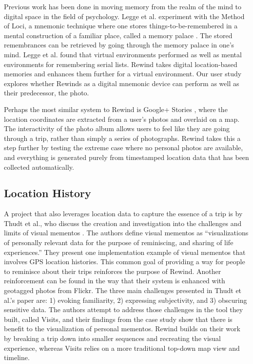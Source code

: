 \documentclass{sigchi}
\begin{document}
Previous work has been done in moving memory from the realm of the mind to digital space in the field of psychology. Legge et al. experiment with the Method of Loci, a mnemonic technique where one stores things-to-be-remembered in a mental construction of a familiar place, called a memory palace \cite{legge2012building}. The stored remembrances can be retrieved by going through the memory palace in one's mind. Legge et al. found that virtual environments performed as well as mental environments for remembering serial lists. Rewind takes digital location-based memories and enhances them further for a virtual environment. Our user study explores whether Rewinds as a digital mnemonic device can perform as well as their predecessor, the photo.

Perhaps the most similar system to Rewind is Google+ Stories \cite{googlestories}, where the location coordinates are extracted from a user's photos and overlaid on a map. The interactivity of the photo album allows users to feel like they are going through a trip, rather than simply a series of photographs. Rewind takes this a step further by testing the extreme case where no personal photos are available, and everything is generated purely from timestamped location data that has been collected automatically.

\subsection{Location History}
A project that also leverages location data to capture the essence of a trip is by Thudt et al., who discuss the creation and investigation into the challenges and limits of visual mementos \cite{thudt2016visual}. The authors define visual mementos as ``visualizations of personally relevant data for the purpose of reminiscing, and sharing of life experiences.'' They present one implementation example of visual mementos that involves GPS location histories. This common goal of providing a way for people to reminisce about their trips reinforces the purpose of Rewind. Another reinforcement can be found in the way that their system is enhanced with geotagged photos from Flickr. The three main challenges presented in Thudt et al.'s paper are: 1) evoking familiarity, 2) expressing subjectivity, and 3) obscuring sensitive data. The authors attempt to address those challenges in the tool they built, called Visits, and their findings from the case study show that there is benefit to the visualization of personal mementos. Rewind builds on their work by breaking a trip down into smaller sequences and recreating the visual experience, whereas Visits relies on a more traditional top-down map view and timeline.
\end{document}
